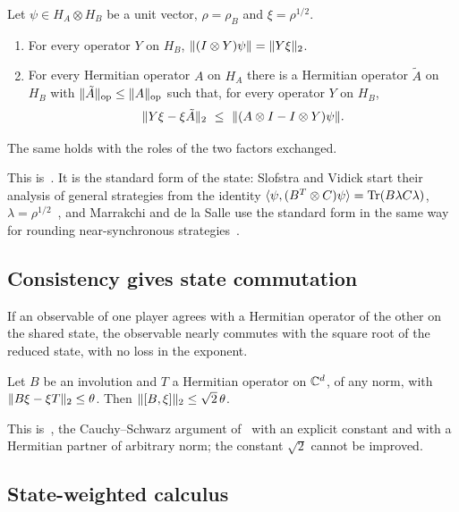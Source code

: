 \begin{lemma}\label{lem:standard-form}
Let $\psi\in H_A\otimes H_B$ be a unit vector, $\rho=\rho_B$ and $\xi=\rho^{1/2}$.
\begin{enumerate}[label=(\alph*),itemsep=1pt]
\item For every operator $Y$ on $H_B$, $\lVert(I\otimes Y)\psi\rVert=\lVert Y\xi\rVert_2$.
\item For every Hermitian operator $A$ on $H_A$ there is a Hermitian operator $\tilde A$ on $H_B$ with
$\lVert \tilde A\rVert_{\mathrm{op}}\le\lVert A\rVert_{\mathrm{op}}$ such that, for every operator $Y$ on $H_B$,
\[
\lVert Y\xi-\xi\tilde A\rVert_2\ \le\ \lVert(A\otimes I-I\otimes Y)\psi\rVert .
\]
\end{enumerate}
The same holds with the roles of the two factors exchanged.
\end{lemma}

This is~\cite[Lemma~3.1]{DM-game}. It is the standard form of the state: Slofstra and Vidick start their analysis of general
strategies from the identity $\langle\psi,(B^T\otimes C)\psi\rangle=\operatorname{Tr}(B\lambda C\lambda)$, $\lambda=\rho^{1/2}$~\cite[proof of
Proposition~5.4]{SV18}, and Marrakchi and de la Salle use the standard form in the same way for rounding near-synchronous
strategies~\cite{MdlS23}.

\subsection{Consistency gives state commutation}\label{sec:prelim-consistency}

If an observable of one player agrees with a Hermitian operator of the other on the shared state, the observable
nearly commutes with the square root of the reduced state, with no loss in the exponent.

\begin{lemma}\label{lem:consistency}
Let $B$ be an involution and $T$ a Hermitian operator on $\mathbb C^d$, of any norm, with $\lVert B\xi-\xi T\rVert_2\le\theta$. Then
$\lVert [B,\xi]\rVert_2\le\sqrt2\,\theta$.
\end{lemma}

This is~\cite[Lemma~3.2]{DM-game}, the Cauchy--Schwarz argument of~\cite[(5.1)]{SV18} with an explicit constant and with a
Hermitian partner of arbitrary norm; the constant $\sqrt2$ cannot be improved.

\subsection{State-weighted calculus}\label{sec:prelim-calculus}


